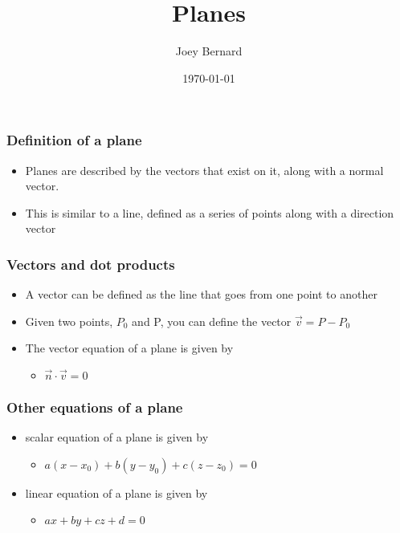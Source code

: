 \documentclass{beamer}
\title{Planes}
\author{Joey Bernard}
\institute{University of New Brunswick}
\date{\today}
\begin{document}
\begin{frame}
  \titlepage
\end{frame}

\begin{frame}
  \frametitle{Definition of a plane}
  \begin{itemize}
  \item Planes are described by the vectors that exist on it, along with a normal vector.
  \item This is similar to a line, defined as a series of points along with a direction vector
  \end{itemize}
\end{frame}

\begin{frame}
  \frametitle{Vectors and dot products}
  \begin{itemize}
  \item A vector can be defined as the line that goes from one point to another
  \item Given two points, $P_0$ and P, you can define the vector $\vec{v} = P - P_0$
  \item The vector equation of a plane is given by
    \begin{itemize}
    \item $\vec{n} \cdot \vec{v} = 0$
    \end{itemize}
  \end{itemize}
\end{frame}

\begin{frame}
  \frametitle{Other equations of a plane}
  \begin{itemize}
  \item scalar equation of a plane is given by
    \begin{itemize}
    \item $a(x-x_0) + b(y-y_0) + c(z-z_0) = 0$
    \end{itemize}
  \item linear equation of a plane is given by
    \begin{itemize}
    \item $ax + by + cz + d = 0$
    \end{itemize}
  \end{itemize}
\end{frame}
\end{document}
